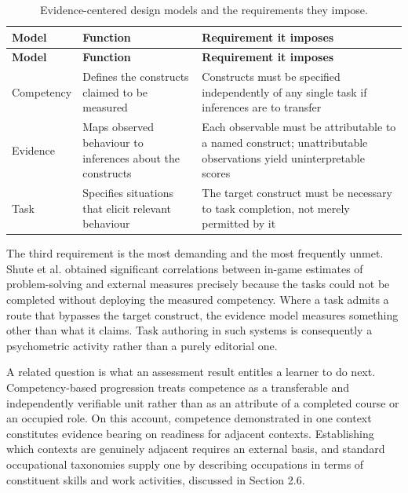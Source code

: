 {\small
\begin{longtable}{|>{\raggedright\arraybackslash}p{}|>{\raggedright\arraybackslash}p{}|>{\raggedright\arraybackslash}p{}|}
\caption{Evidence-centered design models and the requirements they impose.} \\
\hline
\textbf{Model} & \textbf{Function} & \textbf{Requirement it imposes} \\ \hline
\endfirsthead
\hline
\textbf{Model} & \textbf{Function} & \textbf{Requirement it imposes} \\ \hline
\endhead
Competency & Defines the constructs claimed to be measured & Constructs must be specified independently of any single task if inferences are to transfer \\ \hline
Evidence & Maps observed behaviour to inferences about the constructs & Each observable must be attributable to a named construct; unattributable observations yield uninterpretable scores \\ \hline
Task & Specifies situations that elicit relevant behaviour & The target construct must be necessary to task completion, not merely permitted by it \\ \hline
\end{longtable}
}

The third requirement is the most demanding and the most frequently unmet. Shute et al.\cite{r21} obtained significant correlations between in-game estimates of problem-solving and external measures precisely because the tasks could not be completed without deploying the measured competency. Where a task admits a route that bypasses the target construct, the evidence model measures something other than what it claims. Task authoring in such systems is consequently a psychometric activity rather than a purely editorial one.

A related question is what an assessment result entitles a learner to do next. Competency-based progression\cite{r22} treats competence as a transferable and independently verifiable unit rather than as an attribute of a completed course or an occupied role. On this account, competence demonstrated in one context constitutes evidence bearing on readiness for adjacent contexts. Establishing which contexts are genuinely adjacent requires an external basis, and standard occupational taxonomies supply one by describing occupations in terms of constituent skills and work activities, discussed in Section 2.6.


